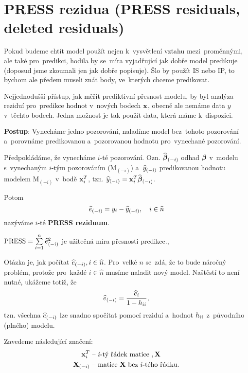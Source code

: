 \section{PRESS rezidua (PRESS residuals, deleted residuals)}

Pokud budeme chtít model použít nejen k~vysvětlení vztahu mezi~proměnnými, ale také pro~predikci, hodila by se~míra vyjadřující jak dobře model predikuje (doposud jsme zkoumali jen jak dobře popisuje). Šlo by použít IS nebo IP, to bychom ale předem museli znát body, ve~kterých chceme predikovat.

Nejjednodušší přístup, jak měřit prediktivní přesnost modelu, by byl analýza reziduí pro~predikce hodnot v~nových bodech $\mathbf{x}$, obecně ale nemáme data $y$ v~těchto bodech. Jedna možnost je tak použít data, která máme k~dispozici.

\textbf{Postup}: Vynecháme jedno pozorování, naladíme model bez~tohoto pozorování a~porovnáme predikovanou a~pozorovanou hodnotu pro~vynechané pozorování.

\begin{define}
Předpokládáme, že vynecháme $i$-té pozorování. Ozn. $\widehat{\boldsymbol{\beta}}_{(-i)}$ odhad $\boldsymbol{\beta}$ v~modelu s~vynechaným $i$-tým pozorováním (M$_{(-i)}$) a~$\widehat{y}_{(-i)}$ predikovanou hodnotu modelem M$_{(-i)}$ v~bodě $\mathbf{x}_i^T$, tzn. $\widehat{y}_{(-i)} = \mathbf{x}_i^T \widehat{\boldsymbol{\beta}}_{(-i)}$.

Potom
 $$
\widehat{e}_{(-i)} = y_i - \widehat{y}_{(-i)}, \quad i\in\widehat{n}
 $$
nazýváme $i$-té \textbf{PRESS reziduum}.

 $\mathrm{PRESS} = \sum\limits_{i=1}^{n} \widehat{e}_{(-i)}^2$ je užitečná míra přesnosti predikce.,
\end{define}

\begin{remark}
Otázka je, jak počítat $\widehat{e}_{(-i)}, i\in\widehat{n} $. Pro~velké $n$ se~zdá, že to bude náročný problém, protože pro~každé $i \in \widehat{n}$ musíme naladit nový model. Naštěstí to není nutné, ukážeme totiž, že
$$
	\widehat{e}_{(-i)} = \frac{\widehat{e}_i}{1 - h_{ii}},
$$
tzn. všechna $\widehat{e}_{(-i)}$ lze snadno spočítat pomocí reziduí a~hodnot $h_{ii}$ z~původního (plného) modelu.
\end{remark}

Zavedeme následující značení:
\begin{align*}
	\mathbf{x}_i^T & \text{ -- $i$-tý řádek matice }, \mathbf{X} \\
	\mathbf{X}_{(-i)} & \text{ -- matice $\mathbf{X}$ bez~$i$-tého řádku}.
\end{align*}

\newcommand{\xtx}{\left(\X^T \X \right)^{-1}}

